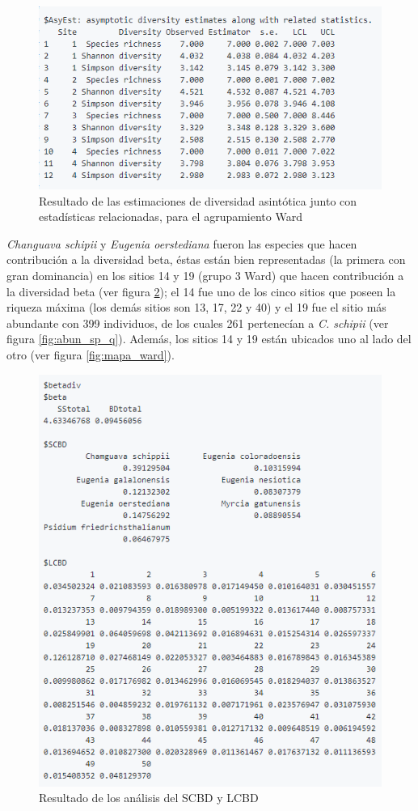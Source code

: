 \documentclass[11pt,]{article}
\begin{document}
\begin{figure}
\centering
\includegraphics{sintotico_ward.png}
\caption{Resultado de las estimaciones de diversidad asintótica junto
con estadísticas relacionadas, para el agrupamiento Ward
\label{sintotico_ward}}
\end{figure}

\emph{Changuava schipii} y \emph{Eugenia oerstediana} fueron las
especies que hacen contribución a la diversidad beta, éstas están bien
representadas (la primera con gran dominancia) en los sitios 14 y 19
(grupo 3 Ward) que hacen contribución a la diversidad beta (ver figura
\ref{fig:beta_div}); el 14 fue uno de los cinco sitios que poseen la
riqueza máxima (los demás sitios son 13, 17, 22 y 40) y el 19 fue el
sitio más abundante con 399 individuos, de los cuales 261 pertenecían a
\emph{C. schipii} (ver figura \ref{fig:abun_sp_q}). Además, los sitios
14 y 19 están ubicados uno al lado del otro (ver figura
\ref{fig:mapa_ward}).

\begin{figure}
\centering
\includegraphics{beta_div.png}
\caption{Resultado de los análisis del SCBD y LCBD\label{fig:beta_div}}
\end{figure}
\end{document}
